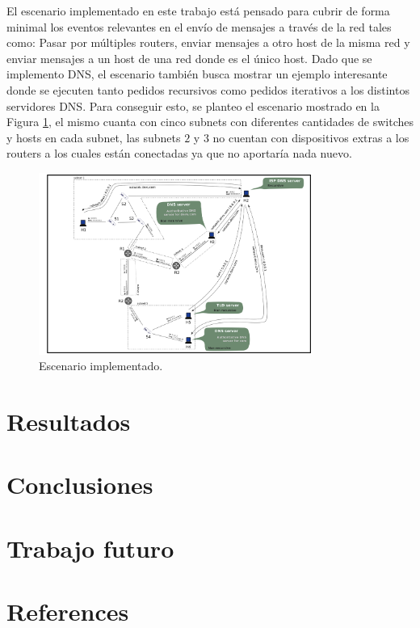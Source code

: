 \documentclass[10pt,a4paper]{article}
\begin{document}
El escenario implementado en este trabajo está pensado para cubrir de forma minimal los eventos relevantes en el envío de mensajes a través de la red tales como: Pasar por múltiples routers, enviar mensajes a otro host de la misma red y enviar mensajes a un host de una red donde es el único host. Dado que se implemento DNS, el escenario también busca mostrar un ejemplo interesante donde se ejecuten tanto pedidos recursivos como pedidos iterativos a los distintos servidores DNS. Para conseguir esto, se planteo el escenario mostrado en la Figura \ref{figure: case stady}, el mismo cuanta con cinco subnets con diferentes cantidades de switches y hosts en cada subnet, las subnets $2$ y $3$ no cuentan con dispositivos extras a los routers a los cuales están conectadas ya que no aportaría nada nuevo. \\

\begin{figure}[!htb]
    \centering
    \includegraphics[width = 0.8\textwidth]{img/png/scenario.png}
    \caption{Escenario implementado.}
    \label{figure: case stady}
\end{figure}

\section{Resultados}
\section{Conclusiones}
\section{Trabajo futuro}
\section{References}


\end{document}
